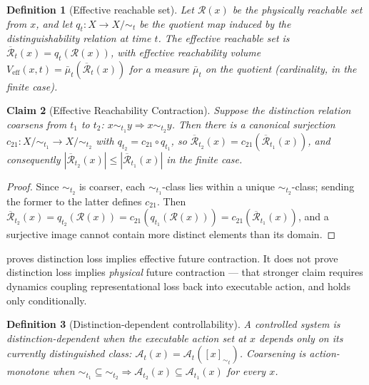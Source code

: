\documentclass[12pt]{report}
\newtheorem{definition}{Definition}[section]
\newtheorem{claim}[definition]{Claim}
\begin{document}
\begin{definition}[Effective reachable set]
\label{def:effective-reach}
Let $\mathcal{R}(x)$ be the physically reachable set from $x$, and let
$q_t : X \to X/{\sim_t}$ be the quotient map induced by the
distinguishability relation at time $t$. The \emph{effective reachable
set} is $\overline{\mathcal{R}}_t(x) = q_t(\mathcal{R}(x))$, with
effective reachability volume $V_{\mathrm{eff}}(x,t) =
\bar\mu_t(\overline{\mathcal{R}}_t(x))$ for a measure $\bar\mu_t$ on the
quotient (cardinality, in the finite case).
\end{definition}

\begin{claim}[Effective Reachability Contraction]
\label{thm:effective-reach-contraction}
Suppose the distinction relation coarsens from $t_1$ to $t_2$:
$x \sim_{t_1} y \Rightarrow x \sim_{t_2} y$. Then there is a canonical
surjection $c_{21} : X/{\sim_{t_1}} \to X/{\sim_{t_2}}$ with $q_{t_2} =
c_{21} \circ q_{t_1}$, so $\overline{\mathcal{R}}_{t_2}(x) =
c_{21}(\overline{\mathcal{R}}_{t_1}(x))$, and consequently
$|\overline{\mathcal{R}}_{t_2}(x)| \leq |\overline{\mathcal{R}}_{t_1}(x)|$
in the finite case.
\end{claim}

\begin{proof}
Since $\sim_{t_2}$ is coarser, each $\sim_{t_1}$-class lies within a
unique $\sim_{t_2}$-class; sending the former to the latter defines
$c_{21}$. Then $\overline{\mathcal{R}}_{t_2}(x) = q_{t_2}(\mathcal{R}(x))
= c_{21}(q_{t_1}(\mathcal{R}(x))) = c_{21}(\overline{\mathcal{R}}_{t_1}(x))$,
and a surjective image cannot contain more distinct elements than its
domain.
\end{proof}

 proves distinction loss implies
effective future contraction. It does not prove distinction loss implies
\emph{physical} future contraction --- that stronger claim requires
dynamics coupling representational loss back into executable action, and
holds only conditionally.

\begin{definition}[Distinction-dependent controllability]
\label{def:action-dependent}
A controlled system is \emph{distinction-dependent} when the executable
action set at $x$ depends only on its currently distinguished class:
$\mathcal{A}_t(x) = \mathcal{A}_t([x]_{\sim_t})$. Coarsening is
\emph{action-monotone} when $\sim_{t_1} \subseteq \sim_{t_2} \Rightarrow
\mathcal{A}_{t_2}(x) \subseteq \mathcal{A}_{t_1}(x)$ for every $x$.
\end{definition}
\end{document}
